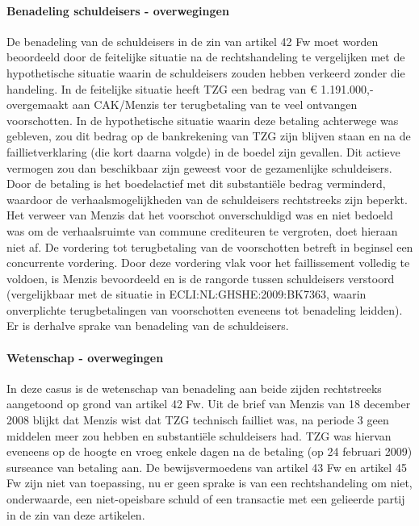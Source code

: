 \documentclass[
  dutch,
  a4paper,
]{article}
\begin{document}
\paragraph{Benadeling schuldeisers - overwegingen}\label{benadeling-schuldeisers---overwegingen-86}

De benadeling van de schuldeisers in de zin van artikel 42 Fw moet worden beoordeeld door de feitelijke situatie na de rechtshandeling te vergelijken met de hypothetische situatie waarin de schuldeisers zouden hebben verkeerd zonder die handeling. In de feitelijke situatie heeft TZG een bedrag van € 1.191.000,- overgemaakt aan CAK/Menzis ter terugbetaling van te veel ontvangen voorschotten. In de hypothetische situatie waarin deze betaling achterwege was gebleven, zou dit bedrag op de bankrekening van TZG zijn blijven staan en na de faillietverklaring (die kort daarna volgde) in de boedel zijn gevallen. Dit actieve vermogen zou dan beschikbaar zijn geweest voor de gezamenlijke schuldeisers. Door de betaling is het boedelactief met dit substantiële bedrag verminderd, waardoor de verhaalsmogelijkheden van de schuldeisers rechtstreeks zijn beperkt. Het verweer van Menzis dat het voorschot onverschuldigd was en niet bedoeld was om de verhaalsruimte van commune crediteuren te vergroten, doet hieraan niet af. De vordering tot terugbetaling van de voorschotten betreft in beginsel een concurrente vordering. Door deze vordering vlak voor het faillissement volledig te voldoen, is Menzis bevoordeeld en is de rangorde tussen schuldeisers verstoord (vergelijkbaar met de situatie in ECLI:NL:GHSHE:2009:BK7363, waarin onverplichte terugbetalingen van voorschotten eveneens tot benadeling leidden). Er is derhalve sprake van benadeling van de schuldeisers.

\paragraph{Wetenschap - overwegingen}\label{wetenschap---overwegingen-86}

In deze casus is de wetenschap van benadeling aan beide zijden rechtstreeks aangetoond op grond van artikel 42 Fw. Uit de brief van Menzis van 18 december 2008 blijkt dat Menzis wist dat TZG technisch failliet was, na periode 3 geen middelen meer zou hebben en substantiële schuldeisers had. TZG was hiervan eveneens op de hoogte en vroeg enkele dagen na de betaling (op 24 februari 2009) surseance van betaling aan. De bewijsvermoedens van artikel 43 Fw en artikel 45 Fw zijn niet van toepassing, nu er geen sprake is van een rechtshandeling om niet, onderwaarde, een niet-opeisbare schuld of een transactie met een gelieerde partij in de zin van deze artikelen.
\end{document}
